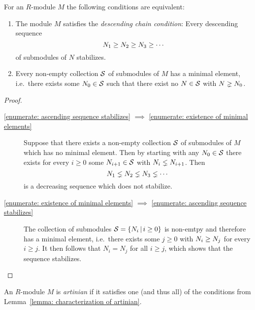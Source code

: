 \begin{lemma}
  \label{lemma: characterization of artinian}
  For an $R$-module $M$ the following conditions are equivalent:
  \begin{enumerate}
    \item
      \label{enumerate: ascending sequence stabilizes}
      The module $M$ satisfies the \emph{descending chain condition}:
      Every descending sequence
      \[
                    N_1
        \geq  N_2
        \geq  N_3
        \geq  \dotsb  
      \]
      of submodules of $N$ stabilizes.
    \item
      \label{enumerate: existence of minimal elements}
      Every non-empty collection $\mathcal{S}$ of submodules of $M$ has a minimal element, i.e.\ there exists some $N_0 \in \mathcal{S}$ such that there exist no $N \in \mathcal{S}$ with $N \gneq N_0$.
  \end{enumerate}
\end{lemma}


\begin{proof}
  \leavevmode
  \begin{description}
    \item[\ref*{enumerate: ascending sequence stabilizes} $\implies$ \ref*{enumerate: existence of minimal elements}]
      Suppose that there exists a non-empty collection $\mathcal{S}$ of submodules of $M$ which has no minimal element.
      Then by starting with any $N_0 \in \mathcal{S}$ there exists for every $i \geq 0$ some $N_{i+1} \in \mathcal{S}$ with $N_i \lneq N_{i+1}$.
      Then
      \[
                    N_1
        \lneq N_2
        \lneq N_3
        \lneq \dotsb  
      \]
      is a decreasing sequence which does not stabilize.
    \item[\ref*{enumerate: existence of minimal elements} $\implies$ \ref*{enumerate: ascending sequence stabilizes}]
      The collection of submodules $\mc{S} = \{N_i \suchthat i \geq 0\}$ is non-emtpy and therefore has a minimal element, i.e.\ there exists some $j \geq 0$ with $N_i \geq N_j$ for every $i \geq j$.
      It then follows that $N_i = N_j$ for all $i \geq j$, which shows that the sequence stabilizes.
    \qedhere
  \end{description}
\end{proof}


\begin{definition}
  An $R$-module $M$ is \emph{artinian} if it satisfies one (and thus all) of the conditions from Lemma~\ref{lemma: characterization of artinian}.
\end{definition}


